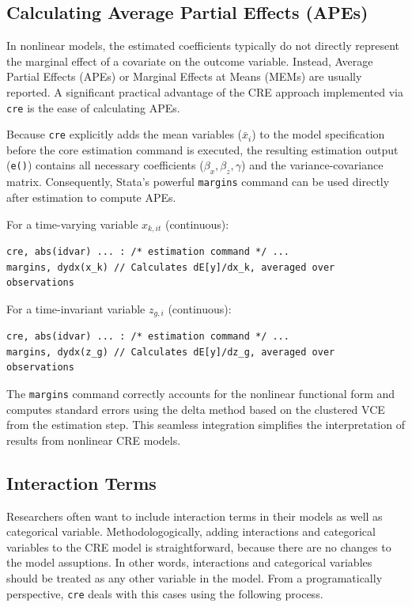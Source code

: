 \documentclass[bib]{statapress}
\begin{document}
\subsection{Calculating Average Partial Effects (APEs)}\label{sec-2-4}

In nonlinear models, the estimated coefficients typically do not
directly represent the marginal effect of a covariate on the outcome
variable. Instead, Average Partial Effects (APEs) or Marginal Effects at
Means (MEMs) are usually reported. A significant practical advantage of
the CRE approach implemented via \texttt{cre} is the ease of calculating
APEs.

Because \texttt{cre} explicitly adds the mean variables (\(\bar x_i\))
to the model specification before the core estimation command is
executed, the resulting estimation output (\texttt{e()}) contains all
necessary coefficients (\(\beta_x, \beta_z, \gamma\)) and the
variance-covariance matrix. Consequently, Stata's powerful
\texttt{margins} command can be used directly after estimation to
compute APEs.

For a time-varying variable \(x_{k,it}\) (continuous):

\begin{verbatim}
cre, abs(idvar) ... : /* estimation command */ ...
margins, dydx(x_k) // Calculates dE[y]/dx_k, averaged over observations
\end{verbatim}

For a time-invariant variable \(z_{g,i}\) (continuous):

\begin{verbatim}
cre, abs(idvar) ... : /* estimation command */ ...
margins, dydx(z_g) // Calculates dE[y]/dz_g, averaged over observations
\end{verbatim}

The \texttt{margins} command correctly accounts for the nonlinear
functional form and computes standard errors using the delta method
based on the clustered VCE from the estimation step. This seamless
integration simplifies the interpretation of results from nonlinear CRE
models.

\subsection{Interaction Terms}\label{sec-2-5}

Researchers often want to include interaction terms in their models as
well as categorical variable. Methodologogically, adding interactions
and categorical variables to the CRE model is straightforward, because
there are no changes to the model assuptions. In other words,
interactions and categorical variables should be treated as any other
variable in the model. From a programatically perspective, \texttt{cre}
deals with this cases using the following process.
\end{document}
